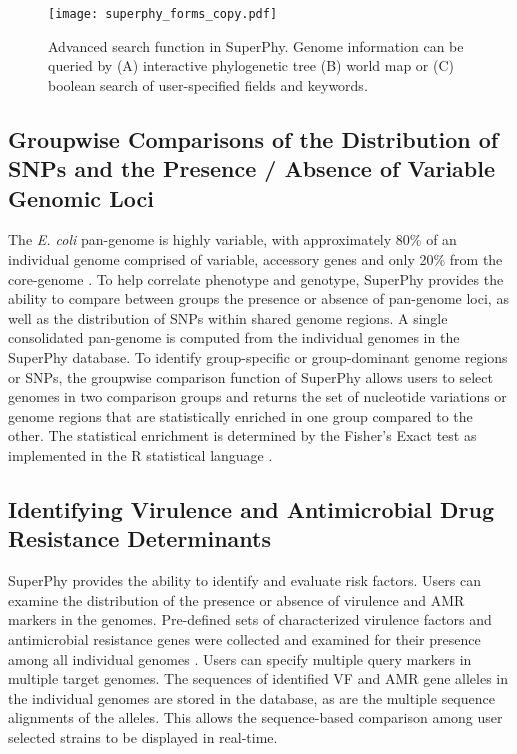 \documentclass[a4paper,twoside]{article}
\begin{document}
\begin{figure}[t]
  \vspace{-0.2cm}
  \centering
   {\texttt{[image: superphy\_forms\_copy.pdf]}}
  \caption{Advanced search function in SuperPhy. Genome information can be queried by (A) interactive phylogenetic tree (B) world map or (C) boolean search of user-specified fields and keywords.}
  \label{fig:search}
\end{figure}


\subsection{Groupwise Comparisons of the Distribution of SNPs and the Presence / Absence of Variable Genomic Loci}

The \textit{E. coli} pan-genome is highly variable, with approximately 80\% of an individual genome comprised of variable, accessory genes and only 20\% from the core-genome \cite{lukjancenko_comparison_2010}. To help correlate phenotype and genotype, SuperPhy provides the ability to compare between groups the presence or absence of pan-genome loci, as well as the distribution of SNPs within shared genome regions. A single consolidated pan-genome is computed from the individual genomes in the SuperPhy database. To identify group-specific or group-dominant genome regions or SNPs, the groupwise comparison function of SuperPhy allows users to select genomes in two comparison groups and returns the set of nucleotide variations or genome regions that are statistically enriched in one group compared to the other. The statistical enrichment is determined by the Fisher's Exact test as implemented in the R statistical language \cite{R_manual}.

\subsection{Identifying Virulence and Antimicrobial Drug Resistance Determinants}

SuperPhy provides the ability to identify and evaluate risk factors. Users can examine the distribution of the presence or absence of virulence and AMR markers in the genomes.  Pre-defined sets of characterized virulence factors and antimicrobial resistance genes were collected and examined for their presence among all individual genomes \cite{mcarthur2012card,chen2012vfdb,chen2005vfdb}. Users can specify multiple query markers in multiple target genomes. The sequences of identified VF and AMR gene alleles in the individual genomes are stored in the database, as are the multiple sequence alignments of the alleles. This allows the sequence-based comparison among user selected strains to be displayed in real-time.
\end{document}
